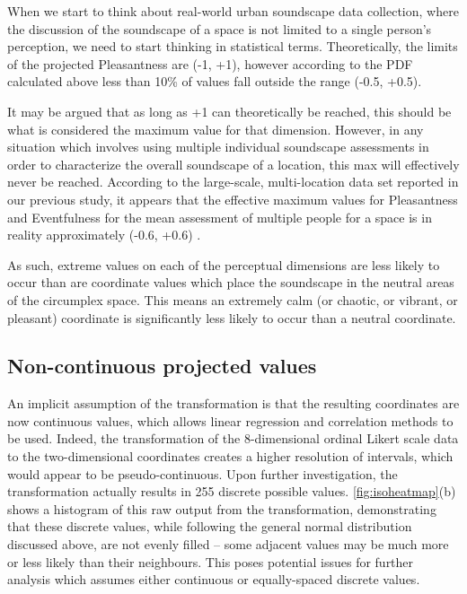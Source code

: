When we start to think about real-world urban soundscape data collection, where the discussion of the soundscape of a space is not limited to a single person's perception, we need to start thinking in statistical terms. Theoretically, the limits of the projected Pleasantness are (-1, +1), however according to the PDF calculated above less than 10\% of values fall outside the range (-0.5, +0.5).

It may be argued that as long as +1 can theoretically be reached, this should be what is considered the maximum value for that dimension. However, in any situation which involves using multiple individual soundscape assessments in order to characterize the overall soundscape of a location, this max will effectively never be reached. According to the large-scale, multi-location data set reported in our previous study, it appears that the effective maximum values for Pleasantness and Eventfulness for the mean assessment of multiple people for a space is in reality approximately (-0.6, +0.6) \citep{Lionello2021Introducing}.

As such, extreme values on each of the perceptual dimensions are less likely to occur than are coordinate values which place the soundscape in the neutral areas of the circumplex space. This means an extremely calm (or chaotic, or vibrant, or pleasant) coordinate is significantly less likely to occur than a neutral coordinate.

\subsection{Non-continuous projected values}
An implicit assumption of the transformation is that the resulting coordinates are now continuous values, which allows linear regression and correlation methods to be used. Indeed, the transformation of the 8-dimensional ordinal Likert scale data to the two-dimensional coordinates creates a higher resolution of intervals, which would appear to be pseudo-continuous. Upon further investigation, the transformation actually results in 255 discrete possible values. \cref{fig:isoheatmap}(b) shows a histogram of this raw output from the transformation, demonstrating that these discrete values, while following the general normal distribution discussed above, are not evenly filled -- some adjacent values may be much more or less likely than their neighbours. This poses potential issues for further analysis which assumes either continuous or equally-spaced discrete values.
